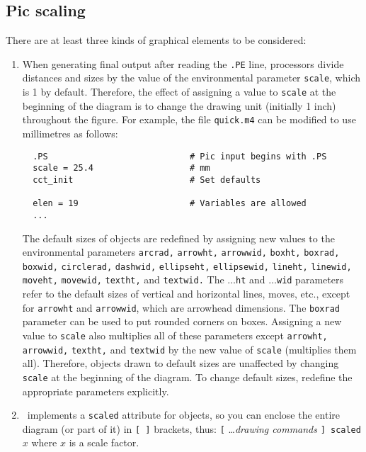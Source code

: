 \subsection{Pic scaling\label{Picscaling:}}
There are at least three kinds of graphical elements to be considered:
\begin{enumerate}
\item When generating final output after reading the {\tt.PE} line,
  \pic processors divide distances and sizes by the value of the
  environmental parameter {\tt scale}, which is 1 by default.  Therefore,
  the effect of assigning a value to {\tt scale} at the beginning of the
  diagram is to change the drawing unit (initially 1 inch) throughout
  the figure.  For example, the file {\tt quick.m4} can be modified to
  use millimetres as follows:
  \begin{verbatim}
  .PS                            # Pic input begins with .PS
  scale = 25.4                   # mm
  cct_init                       # Set defaults

  elen = 19                      # Variables are allowed
  ...
  \end{verbatim}
\vspace*{-1.5\baselineskip}
  The default sizes of \pic objects
  are redefined by assigning new values to the environmental parameters
  {\tt arcrad,} {\tt arrowht,} {\tt arrowwid,} {\tt boxht,} {\tt boxrad,}
  {\tt boxwid,} {\tt circlerad,} {\tt dashwid,} {\tt ellipseht,}
  {\tt ellipsewid,} {\tt lineht,} {\tt linewid,} {\tt moveht,}
  {\tt movewid,}
  {\tt textht,} and {\tt textwid.}
  The $\ldots${\tt ht} and $\ldots${\tt wid} parameters refer to the
  default sizes of vertical and horizontal lines, moves, etc., except for
  {\tt arrowht} and {\tt arrowwid}, which are arrowhead dimensions.
  The {\tt boxrad} parameter can be used to put rounded corners on boxes.
  Assigning a new value to {\tt scale} also multiplies all of these 
  parameters except {\tt arrowht,} {\tt arrowwid,} {\tt textht,} and
  {\tt textwid} by the new value of {\tt scale} (\gpic multiplies them all).
  Therefore, objects drawn to default sizes are unaffected by changing
  {\tt scale} at the beginning of the diagram.
  To change default sizes, redefine the appropriate parameters explicitly.

\item \Dpic\ implements a {\tt scaled} attribute for objects, so you can
  enclose the entire diagram (or part of it) in {\tt [ ]} brackets, thus:
  {\tt [} \ldots {\sl drawing commands} {\tt ] scaled} $x$ where $x$ is a
  scale factor. 


\end{enumerate}
